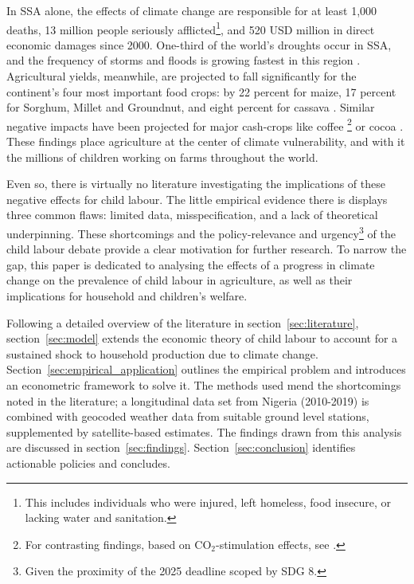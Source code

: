 \documentclass[a4paper,12pt]{article}
\theoremstyle{plain}
\theoremstyle{definition}
\theoremstyle{definition}
\theoremstyle{definition}
\theoremstyle{definition}
\begin{document}
In SSA alone, the effects of climate change are responsible for at least 1,000 deaths, 13 million people seriously afflicted\footnote{This includes individuals who were injured, left homeless, food insecure, or lacking water and sanitation.}, and 520 USD million in direct economic damages since 2000. One-third of the world’s droughts occur in SSA, and the frequency of storms and floods is growing fastest in this region \citep{IMF2020}. Agricultural yields, meanwhile, are projected to fall significantly for the continent's four most important food crops: by 22 percent for maize, 17 percent for Sorghum, Millet and Groundnut, and eight percent for cassava \citep{Schlenker2010}. Similar negative impacts have been projected for major cash-crops like coffee \citep{Craparo2015}\footnote{For contrasting findings, based on CO$_2$-stimulation effects, see \citep{DaMatta2019}.} or cocoa \citep{Boeckx2020}. These findings place agriculture at the center of climate vulnerability, and with it the millions of children working on farms throughout the world.

Even so, there is virtually no literature investigating the implications of these negative effects for child labour. The little empirical evidence there is displays three common flaws: limited data, misspecification, and a lack of theoretical underpinning. These shortcomings and the policy-relevance and urgency\footnote{Given the proximity of the 2025 deadline scoped by SDG 8.} of the child labour debate provide a clear motivation for further research. To narrow the gap, this paper is dedicated to analysing the effects of a progress in climate change on the prevalence of child labour in agriculture, as well as their implications for household and children’s welfare.

Following a detailed overview of the literature in section~\ref{sec:literature}, section~\ref{sec:model} extends the economic theory of child labour to account for a sustained shock to household production due to climate change. Section~\ref{sec:empirical_application} outlines the empirical problem and introduces an econometric framework to solve it. The methods used mend the shortcomings noted in the literature; a longitudinal data set from Nigeria (2010-2019) is combined with geocoded weather data from suitable ground level stations, supplemented by satellite-based estimates. The findings drawn from this analysis are discussed in section~\ref{sec:findings}. %
Section~\ref{sec:conclusion} identifies actionable policies and concludes.
\end{document}
